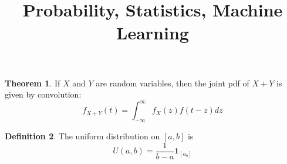 \documentclass[12pt]{article}
\theoremstyle{definition}
\newtheorem{thm}{Theorem}
\newtheorem{defn}[thm]{Definition}
\begin{document}
\title{Probability, Statistics, Machine Learning}
\begin{thm}
If $ X $ and $ Y $ are random variables, then the joint pdf of $ X+Y $ is given by convolution:
$$ f_{X+Y}(t) = \int_{-\infty}^{\infty} f_X(z)f(t-z)  dz$$ 
\end{thm}

\begin{defn}
    The uniform distribution on $ [a,b] $ is
    $$ U(a,b) = \frac{1}{b-a}\boldsymbol{1}_{[a_b]}$$ 
\end{defn}
\end{document}
